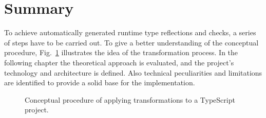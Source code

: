 \section{Summary}
\label{sec:theoretical-approach-summary}

To achieve automatically generated runtime type reflections and checks, a series of steps have to be carried out. To give a better understanding of the conceptual procedure, Fig.~\ref{fig:theoretical-approach} illustrates the idea of the transformation process. In the following chapter the theoretical approach is evaluated, and the project's technology and architecture is defined. Also technical peculiarities and limitations are identified to provide a solid base for the implementation.
\begin{figure}[b]
\centering

\caption{Conceptual procedure of applying transformations to a TypeScript project.}
\label{fig:theoretical-approach}
\end{figure}

